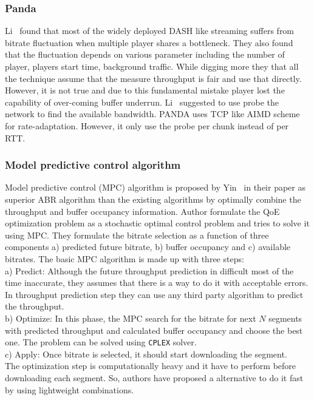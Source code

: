 \subsubsection{Panda\cite{140405}}
Li \etal\ found that most of the widely deployed DASH like streaming suffers from bitrate fluctuation when multiple player shares a bottleneck. They also found that the fluctuation depends on various parameter including the number of player, players start time, background traffic. While digging more they that all the technique assume that the measure throughput is fair and use that directly. However, it is not true and due to this fundamental mistake player lost the capability of over-coming buffer underrun. Li \etal\ suggested to use probe the network to find the available bandwidth. PANDA uses TCP like AIMD scheme for rate-adaptation. However, it only use the probe per chunk instead of per RTT.

\subsubsection{Model predictive control algorithm\cite{10.1145/2785956.2787486,10.1145/2670518.2673877}}
Model predictive control (MPC) algorithm is proposed by Yin \etal\ in their paper \cite{10.1145/2785956.2787486,10.1145/2670518.2673877} as superior ABR algorithm than the existing algorithms by optimally combine the throughput and buffer occupancy information. Author formulate the QoE optimization problem as a stochastic optimal control problem and tries to solve it using MPC. They formulate the bitrate selection as a function of three components a) predicted future bitrate, b) buffer occupancy and c) available bitrates. The basic MPC algorithm is made up with three steps: \\
a) Predict: Although the future throughput prediction in difficult most of the time inaccurate, they assumes that there is a way to do it with acceptable errors. In throughput prediction step they can use any third party algorithm to predict the throughput.\\
b) Optimize: In this phase, the MPC search for the bitrate for next $N$ segments with predicted throughput and calculated buffer occupancy and choose the best one. The problem can be solved using {\tt CPLEX} solver.\\
c) Apply: Once bitrate is selected, it should start downloading the segment.\\
The optimization step is computationally heavy and it have to perform before downloading each segment. So, authors have proposed a alternative to do it fast by using lightweight combinations.


